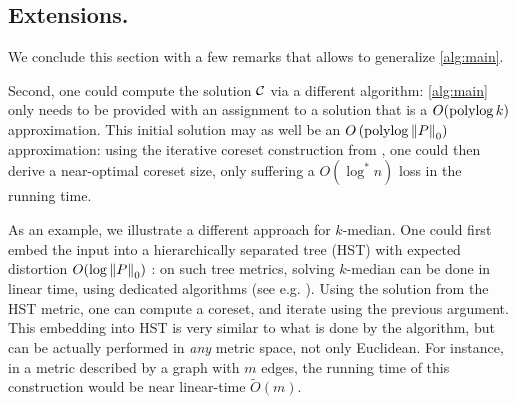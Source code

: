 \subsection*{Extensions.} 
We conclude this section with a few remarks that allows to generalize \cref{alg:main}.

Second, one could compute the solution $\mathcal C$ via a different algorithm: \cref{alg:main} only needs to be provided with an assignment to a solution that is a $O(\operatorname{polylog} k)$ approximation. 
This initial solution may as well be an $O\left(\operatorname{polylog} \left\| P \right\|_0 \right)$ approximation: using the iterative coreset construction from \cite{BravermanJKW21}, one could then derive a near-optimal coreset size, only suffering a $O(\log^* n)$ loss in the running time.

As an example, we illustrate a different approach for $k$-median. One could first embed the input into a hierarchically separated tree (HST) with expected distortion $O(\log \left\| P \right\|_0)$ \cite{FakcharoenpholRT03}: on such tree metrics, solving $k$-median can be done in linear time, using dedicated algorithms (see e.g. \cite{Cohen-AddadLNSS21}). Using the solution from the HST metric, one can compute a coreset, and iterate using the previous argument.
This embedding into HST is very similar to what is done by the \fkmeans algorithm, but can be actually performed in \emph{any} metric space, not only Euclidean. 
For instance, in a metric described by a graph with $m$ edges, the running time of this construction would be near linear-time $\tilde O(m)$. %
